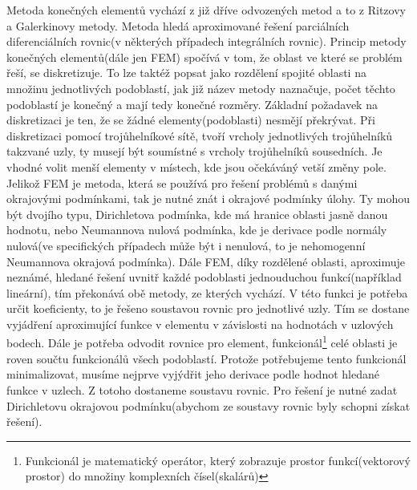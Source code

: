 Metoda konečných elementů vychází z již dříve odvozených metod a to z Ritzovy a Galerkinovy metody. Metoda hledá aproximované řešení parciálních diferenciálních rovnic(v některých případech integrálních rovnic).
Princip metody konečných elementů(dále jen FEM) spočívá v tom, že oblast ve které se problém řeší, se diskretizuje. To lze taktéž popsat jako rozdělení spojité oblasti na množinu jednotlivých podoblastí, jak již název metody naznačuje, počet těchto podoblastí je konečný a mají tedy konečné rozměry. Základní požadavek na diskretizaci je ten, že se žádné elementy(podoblasti) nesmějí překrývat. Při diskretizaci pomocí trojůhelníkové sítě, tvoří vrcholy jednotlivých trojůhelníků takzvané uzly, ty musejí být soumístné s vrcholy trojůhelníků sousedních. Je vhodné volit menší elementy v místech, kde jsou očekáváný vetší změny pole. Jelikož FEM je metoda, která se používá pro řešení problémů s danými okrajovými podmínkami, tak je nutné znát i okrajové podmínky úlohy. Ty mohou být dvojího typu, Dirichletova podmínka, kde má hranice oblasti jasně danou hodnotu, nebo Neumannova nulová podmínka, kde je derivace podle normály nulová(ve specifických případech může být i nenulová, to je nehomogenní Neumannova okrajová podmínka). Dále FEM, díky rozdělené oblasti, aproximuje neznámé, hledané řešení uvnitř každé podoblasti jednouduchou funkcí(například lineární), tím překonává obě metody, ze kterých vychází. V této funkci je potřeba určit koeficienty, to je řešeno soustavou rovnic pro jednotlivé uzly. Tím se dostane vyjádření aproximující funkce v elementu v závislosti na hodnotách v uzlových bodech. Dále je potřeba odvodit rovnice pro element, funkcionál\footnote[1]{Funkcionál je matematický operátor, který zobrazuje prostor funkcí(vektorový prostor) do množiny komplexních čísel(skalárů)} celé oblasti je roven součtu funkcionálů všech podoblastí. Protože potřebujeme tento funkcionál minimalizovat, musíme nejprve vyjýdřit jeho derivace podle hodnot hledané funkce v uzlech. Z totoho dostaneme soustavu rovnic. Pro řešení je nutné zadat Dirichletovu okrajovou podmínku(abychom ze soustavy rovnic byly schopni získat řešení).
